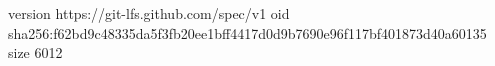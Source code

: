 version https://git-lfs.github.com/spec/v1
oid sha256:f62bd9c48335da5f3fb20ee1bff4417d0d9b7690e96f117bf401873d40a60135
size 6012

